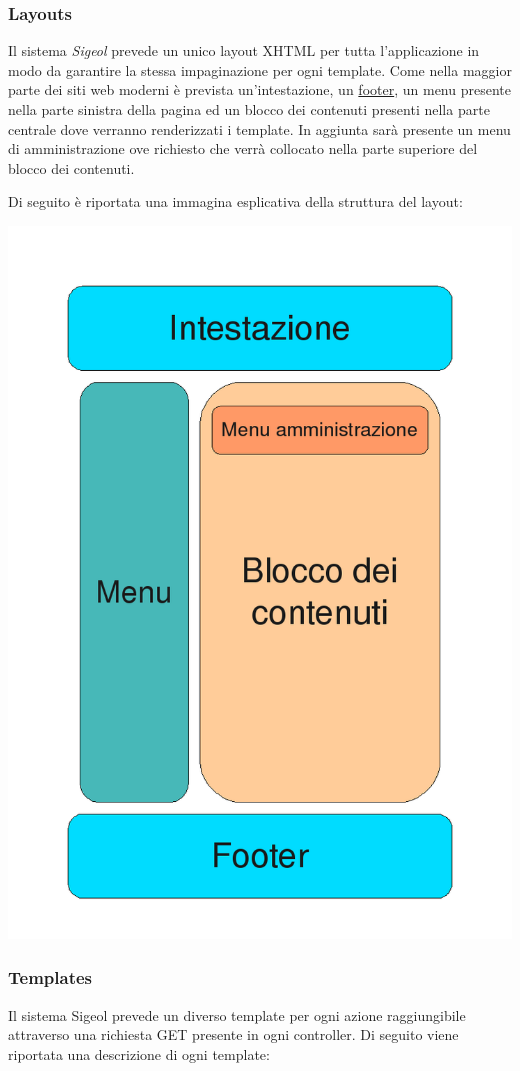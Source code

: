 \documentclass[11pt,a4paper]{article}
\begin{document}
\subsubsection{Layouts}
Il sistema \textit{Sigeol} prevede un unico layout XHTML per tutta l'applicazione in modo da garantire la stessa impaginazione per ogni template. Come nella maggior parte dei siti web moderni è prevista un'intestazione, un \underline{footer}, un menu presente nella parte sinistra della pagina ed un blocco dei contenuti presenti nella parte centrale dove verranno renderizzati i template. In aggiunta sarà presente un menu di amministrazione ove richiesto che verrà collocato nella parte superiore del blocco dei contenuti.

Di seguito è riportata una immagina esplicativa della struttura del layout:

\includegraphics[scale=0.50]{images/layout.png}
\subsubsection{Templates}
Il sistema Sigeol prevede un diverso template per ogni azione raggiungibile attraverso una richiesta GET presente in ogni controller. Di seguito viene riportata una descrizione di ogni template:
\end{document}
